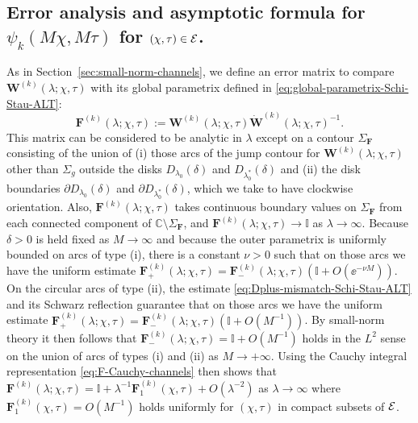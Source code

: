 \subsection{Error analysis and asymptotic formula for $\psi_k(M\chi,M\tau)$ for $(\chi,\tau)\in \mathcal{E}$.}
As in Section~\ref{sec:small-norm-channels}, we define an error matrix to compare $\mathbf{W}^{(k)}(\lambda;\chi,\tau)$ with its global parametrix defined in \eqref{eq:global-parametrix-Schi-Stau-ALT}:
\begin{equation}
\mathbf{F}^{(k)}(\lambda;\chi,\tau):=\mathbf{W}^{(k)}(\lambda;\chi,\tau)\dot{\mathbf{W}}^{(k)}(\lambda;\chi,\tau)^{-1}.
\end{equation}
This matrix can be considered to be analytic in $\lambda$ except on a contour $\Sigma_\mathbf{F}$ consisting of the union of (i) those arcs of the jump contour for $\mathbf{W}^{(k)}(\lambda;\chi,\tau)$ other than $\Sigma_g$ outside the disks $D_{\lambda_0}(\delta)$ and $D_{\lambda_0^*}(\delta)$ and (ii) the disk boundaries $\partial D_{\lambda_0}(\delta)$ and $\partial D_{\lambda_0^*}(\delta)$, which we take to have clockwise orientation.  Also, $\mathbf{F}^{(k)}(\lambda;\chi,\tau)$ takes continuous boundary values on $\Sigma_\mathbf{F}$ from each connected component of $\mathbb{C}\setminus\Sigma_\mathbf{F}$, and $\mathbf{F}^{(k)}(\lambda;\chi,\tau)\to\mathbb{I}$ as $\lambda\to\infty$. Because $\delta>0$ is held fixed as $M\to\infty$ and because the outer parametrix is uniformly bounded on arcs of type (i), there is a constant $\nu>0$ such that on those arcs we have the uniform estimate $\mathbf{F}^{(k)}_+(\lambda;\chi,\tau)=\mathbf{F}^{(k)}_-(\lambda;\chi,\tau)(\mathbb{I}+O(\ee^{-\nu M}))$.  On the circular arcs of type (ii), the estimate \eqref{eq:Dplus-mismatch-Schi-Stau-ALT} and its Schwarz reflection guarantee that on those arcs we have the uniform estimate $\mathbf{F}^{(k)}_+(\lambda;\chi,\tau)=\mathbf{F}^{(k)}_-(\lambda;\chi,\tau)(\mathbb{I}+O(M^{-1}))$. By small-norm theory it then follows that $\mathbf{F}^{(k)}_-(\lambda;\chi,\tau)=\mathbb{I}+O(M^{-1})$ holds in the $L^2$ sense on the union of arcs of types (i) and (ii) as $M\to+\infty$.  Using the Cauchy integral representation \eqref{eq:F-Cauchy-channels} then shows that $\mathbf{F}^{(k)}(\lambda;\chi,\tau)=\mathbb{I}+\lambda^{-1}\mathbf{F}_1^{(k)}(\chi,\tau) + O(\lambda^{-2})$ as $\lambda\to\infty$ where $\mathbf{F}_1^{(k)}(\chi,\tau)=O(M^{-1})$ holds uniformly for $(\chi,\tau)$ in compact subsets of $\mathcal{E}$.

